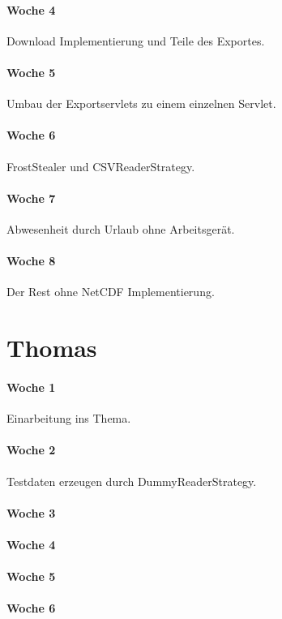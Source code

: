 \paragraph{Woche 4}
Download Implementierung und Teile des Exportes.
\paragraph{Woche 5}
Umbau der Exportservlets zu einem einzelnen Servlet.
\paragraph{Woche 6}
FrostStealer und CSVReaderStrategy.
\paragraph{Woche 7}
Abwesenheit durch Urlaub ohne Arbeitsgerät.
\paragraph{Woche 8}
Der Rest ohne NetCDF Implementierung.

\section{Thomas}
\paragraph{Woche 1}
Einarbeitung ins Thema.
\paragraph{Woche 2}
Testdaten erzeugen durch DummyReaderStrategy.
\paragraph{Woche 3}

\paragraph{Woche 4}

\paragraph{Woche 5}

\paragraph{Woche 6}

